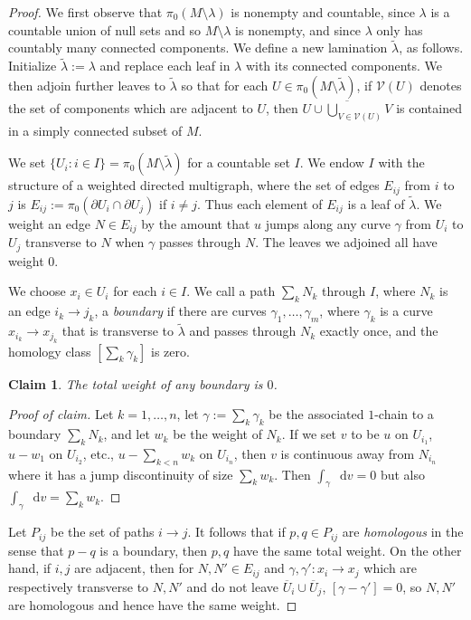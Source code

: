 \documentclass[reqno,10pt]{amsart}
\newcommand*\dif{\mathop{}\!\mathrm{d}}
\newcommand{\dfn}[1]{\emph{#1}\index{#1}}
\newtheorem{claim}{Claim}[theorem]
\theoremstyle{definition}
\numberwithin{equation}{section}
\begin{document}
\begin{proof}
We first observe that $\pi_0(M \setminus \lambda)$ is nonempty and countable, since $\lambda$ is a countable union of null sets and so $M \setminus \lambda$ is nonempty, and since $\lambda$ only has countably many connected components.
We define a new lamination $\tilde \lambda$, as follows. Initialize $\tilde \lambda := \lambda$ and replace each leaf in $\lambda$ with its connected components.
We then adjoin further leaves to $\tilde \lambda$ so that for each $U \in \pi_0(M \setminus \tilde \lambda)$, if $\mathcal V(U)$ denotes the set of components which are adjacent to $U$, then $\overline{U \cup \bigcup_{V \in \mathcal V(U)} V}$ is contained in a simply connected subset of $M$.

We set $\{U_i: i \in I\} = \pi_0(M \setminus \tilde \lambda)$ for a countable set $I$.
We endow $I$ with the structure of a weighted directed multigraph, where the set of edges $E_{ij}$ from $i$ to $j$ is $E_{ij} := \pi_0(\partial U_i \cap \partial U_j)$ if $i \neq j$.
Thus each element of $E_{ij}$ is a leaf of $\tilde \lambda$.
We weight an edge $N \in E_{ij}$ by the amount that $u$ jumps along any curve $\gamma$ from $U_i$ to $U_j$ transverse to $N$ when $\gamma$ passes through $N$.
The leaves we adjoined all have weight $0$.

We choose $x_i \in U_i$ for each $i \in I$.
We call a path $\sum_k N_k$ through $I$, where $N_k$ is an edge $i_k \to j_k$, a \dfn{boundary} if there are curves $\gamma_1, \dots, \gamma_m$, where $\gamma_k$ is a curve $x_{i_k} \to x_{j_k}$ that is transverse to $\tilde \lambda$ and passes through $N_k$ exactly once, and the homology class $[\sum_k \gamma_k]$ is zero.

\begin{claim}
The total weight of any boundary is $0$.
\end{claim}
\begin{proof}[Proof of claim]
Let $k = 1, \dots, n$, let $\gamma := \sum_k \gamma_k$ be the associated $1$-chain to a boundary $\sum_k N_k$, and let $w_k$ be the weight of $N_k$.
If we set $v$ to be $u$ on $U_{i_1}$, $u - w_1$ on $U_{i_2}$, etc., $u - \sum_{k < n} w_k$ on $U_{i_n}$, then $v$ is continuous away from $N_{i_n}$ where it has a jump discontinuity of size $\sum_k w_k$.
Then $\int_\gamma \dif v = 0$ but also $\int_\gamma \dif v = \sum_k w_k$.
\end{proof}

Let $P_{ij}$ be the set of paths $i \to j$.
It follows that if $p, q \in P_{ij}$ are \dfn{homologous} in the sense that $p - q$ is a boundary, then $p, q$ have the same total weight.
On the other hand, if $i, j$ are adjacent, then for $N, N' \in E_{ij}$ and $\gamma, \gamma': x_i \to x_j$ which are respectively transverse to $N, N'$ and do not leave $\overline U_i \cup \overline U_j$, $[\gamma - \gamma'] = 0$, so $N, N'$ are homologous and hence have the same weight.


\end{proof}
\end{document}
